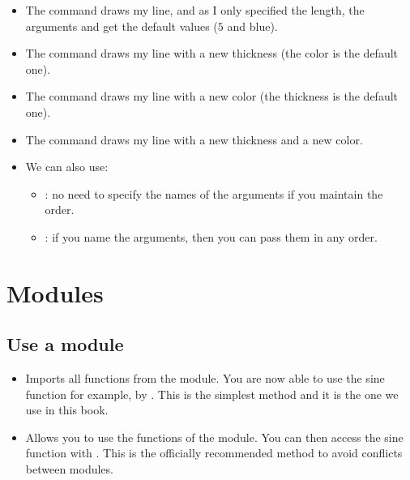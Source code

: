 \documentclass[11pt,class=report,crop=false]{standalone}
\begin{document}
 
\begin{itemize}
  \item The command  draws my line, and as I only specified the length, the arguments  and  get the default values ($5$ and blue).
  
   \item The command  draws my line with a new thickness (the color is the default one).
   
    \item The command  draws my line with a new color (the thickness is the default one).  
    
     \item The command  draws my line with a new thickness and a new color.
     
     \item We can also use:
     \begin{itemize}
       \item {}: no need to specify the names of the arguments if you maintain the order.
       \item {}: if you name the arguments, then you can pass them in any order.
 
  \end{itemize}   
\end{itemize}   


\section{Modules}

\subsection{Use a module}

\begin{itemize}
  \item {} \quad Imports all functions from the  module. You are now able to use the sine function for example, by . This is the simplest method and it is the one we use in this book.
  
  \item {} \quad Allows you to use the functions of the  module. You can then access the sine function with . This is the officially recommended method to avoid conflicts between modules.
\end{itemize}
\end{document}
